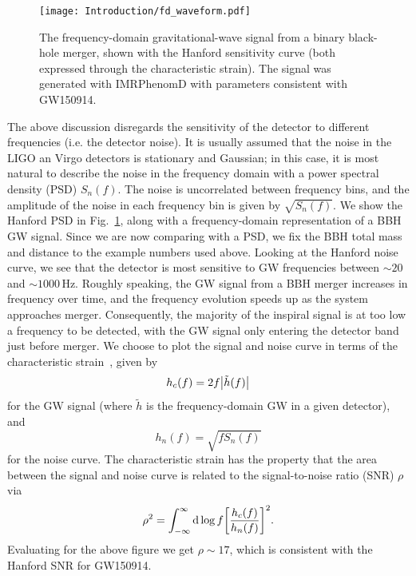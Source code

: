 \begin{figure}[t]
	\centering
	\texttt{[image: Introduction/fd\_waveform.pdf]}
	\caption[The frequency-domain gravitational-wave signal from a binary black-hole merger.]{ 
		The frequency-domain gravitational-wave signal from a binary black-hole merger, shown with the Hanford sensitivity curve (both expressed through the characteristic strain). The signal was generated with IMRPhenomD with parameters consistent with GW150914.}
	\label{fig:ch1:fd_waveform}
\end{figure}

The above discussion disregards the sensitivity of the detector to different frequencies (i.e. the detector noise).
It is usually assumed that the noise in the LIGO an Virgo detectors is stationary and Gaussian; in this case, it is most natural to describe the noise in the frequency domain with a power spectral density (PSD) $S_n(f)$.
The noise is uncorrelated between frequency bins, and the amplitude of the noise in each frequency bin is given by $\sqrt{S_n(f)}$. 
We show the Hanford PSD in Fig.~\ref{fig:ch1:fd_waveform}, along with a frequency-domain representation of a BBH GW signal. 
Since we are now comparing with a PSD, we fix the BBH total mass and distance to the example numbers used above. 
Looking at the Hanford noise curve, we see that the detector is most sensitive to GW frequencies between $\sim 20$ and $\sim 1000\,\mathrm{Hz}$.
Roughly speaking, the GW signal from a BBH merger increases in frequency over time, and the frequency evolution speeds up as the system approaches merger.
Consequently, the majority of the inspiral signal is at too low a frequency to be detected, with the GW signal only entering the detector band just before merger.
We choose to plot the signal and noise curve in terms of the characteristic strain~\cite{Moore:2014lga}, given by
\begin{equation}
    h_c(f) = 2f\abs{\tilde{h}(f)}
\end{equation}
for the GW signal (where $\tilde{h}$ is the frequency-domain GW in a given detector), and
\begin{equation}
    h_n(f) = \sqrt{fS_n(f)}
\end{equation}
for the noise curve.
The characteristic strain has the property that the area between the signal and noise curve is related to the signal-to-noise ratio (SNR) $\rho$ via
\begin{equation}
    \rho^2 = \int_{-\infty}^\infty \dd\log{f} \qty[\frac{h_c(f)}{h_n(f)}]^2.
\end{equation}
Evaluating for the above figure we get $\rho \sim 17$, which is consistent with the Hanford SNR for GW150914.

